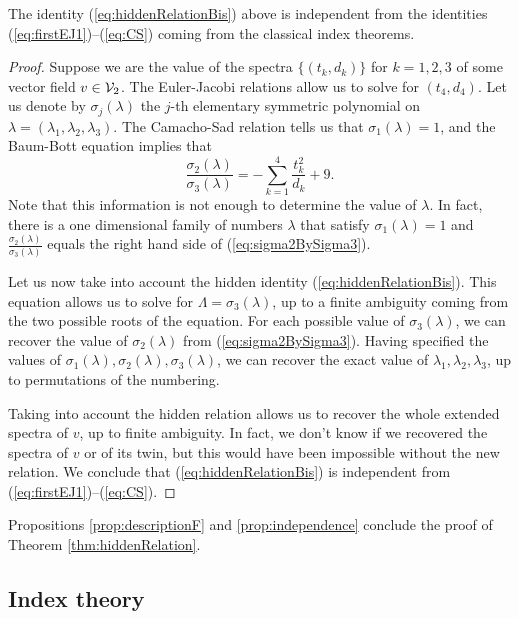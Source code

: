 \documentclass[phd,tocprelim]{cornell}
\begin{document}
\begin{proposition}\label{prop:independence}
 The identity (\ref{eq:hiddenRelationBis}) above is independent from the identities (\ref{eq:firstEJ1})--(\ref{eq:CS}) coming from the classical index theorems. 
\end{proposition}

\begin{proof}
 Suppose we are the value of the spectra $\{(t_k,d_k)\}$ for $k=1,2,3$ of some vector field $v\in\mathcal{V}_2$. The Euler-Jacobi relations allow us to solve for $(t_4,d_4)$. Let us denote by $\sigma_j(\lambda)$ the $j$-th elementary symmetric polynomial on $\lambda=(\lambda_1,\lambda_2,\lambda_3)$. The Camacho-Sad relation tells us that $\sigma_1(\lambda)=1$, and the Baum-Bott equation implies that
  \begin{equation}\label{eq:sigma2BySigma3}
   \frac{\sigma_2(\lambda)}{\sigma_3(\lambda)} = -\sum_{k=1}^4 \frac{t_k^2}{d_k} + 9 .
  \end{equation}
 Note that this information is not enough to determine the value of $\lambda$. In fact, there is a one dimensional family of numbers $\lambda$ that satisfy $\sigma_1(\lambda)=1$ and $\frac{\sigma_2(\lambda)}{\sigma_3(\lambda)}$ equals the right hand side of (\ref{eq:sigma2BySigma3}).
 
 Let us now take into account the hidden identity (\ref{eq:hiddenRelationBis}). This equation allows us to solve for $\Lambda=\sigma_3(\lambda)$, up to a finite ambiguity coming from the two possible roots of the equation. For each possible value of $\sigma_3(\lambda)$, we can recover the value of $\sigma_2(\lambda)$ from (\ref{eq:sigma2BySigma3}). Having specified the values of $\sigma_1(\lambda),\sigma_2(\lambda),\sigma_3(\lambda)$, we can recover the exact value of $\lambda_1,\lambda_2,\lambda_3$, up to permutations of the numbering. 
 
 Taking into account the hidden relation allows us to recover the whole extended spectra of $v$, up to finite ambiguity. In fact, we don't know if we recovered the spectra of $v$ or of its twin, but this would have been impossible without the new relation. We conclude that (\ref{eq:hiddenRelationBis}) is independent from (\ref{eq:firstEJ1})--(\ref{eq:CS}).
\end{proof}

Propositions \ref{prop:descriptionF} and \ref{prop:independence} conclude the proof of Theorem \ref{thm:hiddenRelation}.


\subsection{Index theory}
\end{document}
